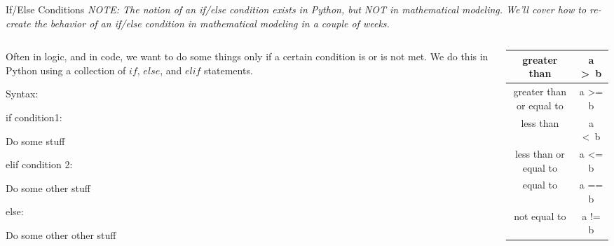 \documentclass[10pt, aspectratio=169]{beamer}
\begin{document}
\begin{frame}[t]{If/Else Conditions}
    \textit{NOTE: The notion of an if/else condition exists in Python, but NOT in mathematical modeling. We'll cover how to re-create the behavior of an if/else condition in mathematical modeling in a couple of weeks.}

    \begin{columns}[t]
        \begin{column}[t]{0.5\textwidth}

            Often in logic, and in code, we want to do some things only if a certain condition is or is not met. We do this in Python using a collection of $if$, $else$, and $elif$ statements.

            \vspace{0.25cm}
            Syntax:
            \vspace{0.25cm}

            if condition1:

            \hspace{0.25cm} Do some stuff

            elif condition 2:

            \hspace{0.25cm} Do some other stuff

            else:

            \hspace{0.25cm} Do some other other stuff

        \end{column}
        \begin{column}[t]{0.5\textwidth}
            \vspace{0.15cm}

            \begin{tabular}{|c|c|}
                \hline
                greater than & a \textgreater\ b \\
                \hline
                greater than or equal to & a \textgreater= b \\
                \hline
                less than & a \textless\ b \\
                \hline
                less than or equal to & a \textless= b \\
                \hline
                equal to & a == b\\
                \hline
                not equal to & a != b \\
                \hline
            \end{tabular}


\end{column}
\end{columns}
\end{frame}
\end{document}
